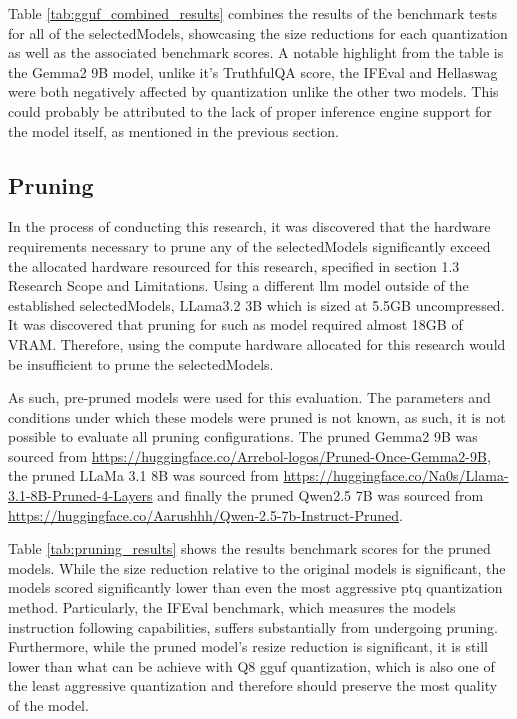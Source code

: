 \documentclass{ifacconf}
\begin{document}
    Table \ref{tab:gguf_combined_results} combines the results of the benchmark tests for all of the \gls{selectedModels}, showcasing the size reductions for each quantization as well as the associated benchmark scores. A notable highlight from the table is the Gemma2 9B model, unlike it's TruthfulQA score, the IFEval and Hellaswag were both negatively affected by quantization unlike the other two models. This could probably be attributed to the lack of proper inference engine support for the model itself, as mentioned in the previous section.

    \subsection{Pruning}
    In the process of conducting this research, it was discovered that the hardware requirements necessary to prune any of the \gls{selectedModels} significantly exceed the allocated hardware resourced for this research, specified in section 1.3 Research Scope and Limitations. Using a different \gls{llm} model outside of the established \gls{selectedModels}, LLama3.2 3B which is sized at 5.5GB uncompressed. It was discovered that pruning for such as model required almost 18GB of VRAM. Therefore, using the compute hardware allocated for this research would be insufficient to prune the \gls{selectedModels}.
    
    As such, pre-pruned models were used for this evaluation. The parameters and conditions under which these models were pruned is not known, as such, it is not possible to evaluate all pruning configurations. 
    The pruned Gemma2 9B was sourced from \url{https://huggingface.co/Arrebol-logos/Pruned-Once-Gemma2-9B}, the pruned LLaMa 3.1 8B was sourced from \url{https://huggingface.co/Na0s/Llama-3.1-8B-Pruned-4-Layers} and finally the pruned Qwen2.5 7B was sourced from \url{https://huggingface.co/Aarushhh/Qwen-2.5-7b-Instruct-Pruned}.
    
    
    Table \ref{tab:pruning_results} shows the results benchmark scores for the pruned models. While the size reduction relative to the original models is significant, the models scored significantly lower than even the most aggressive \gls{ptq} quantization method. Particularly, the IFEval benchmark, which measures the models instruction following capabilities, suffers substantially from undergoing pruning. Furthermore, while the pruned model's resize reduction is significant, it is still lower than what can be achieve with Q8 \gls{gguf} quantization, which is also one of the least aggressive quantization and therefore should preserve the most quality of the model.
\end{document}
